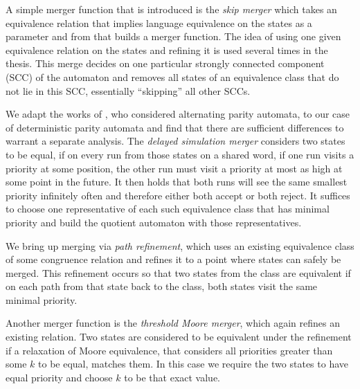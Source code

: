 A simple merger function that is introduced is the \emph{skip merger} which takes an equivalence relation that implies language equivalence on the states as a parameter and from that builds a merger function. The idea of using one given equivalence relation on the states and refining it is used several times in the thesis. This merge decides on one particular strongly connected component (SCC) of the automaton and removes all states of an equivalence class that do not lie in this SCC, essentially \enquote{skipping} all other SCCs.

We adapt the works of \cite{FritzWilke06}, who considered alternating parity automata, to our case of deterministic parity automata and find that there are sufficient differences to warrant a separate analysis. The \emph{delayed simulation merger} considers two states to be equal, if on every run from those states on a shared word, if one run visits a priority at some position, the other run must visit a priority at most as high at some point in the future. It then holds that both runs will see the same smallest priority infinitely often and therefore either both accept or both reject. It suffices to choose one representative of each such equivalence class that has minimal priority and build the quotient automaton with those representatives.


We bring up merging via \emph{path refinement}, which uses an existing equivalence class of some congruence relation and refines it to a point where states can safely be merged. This refinement occurs so that two states from the class are equivalent if on each path from that state back to the class, both states visit the same minimal priority. 

Another merger function is the \emph{threshold Moore merger}, which again refines an existing relation. Two states are considered to be equivalent under the refinement if a relaxation of Moore equivalence, that considers all priorities greater than some $k$ to be equal, matches them. In this case we require the two states to have equal priority and choose $k$ to be that exact value.

